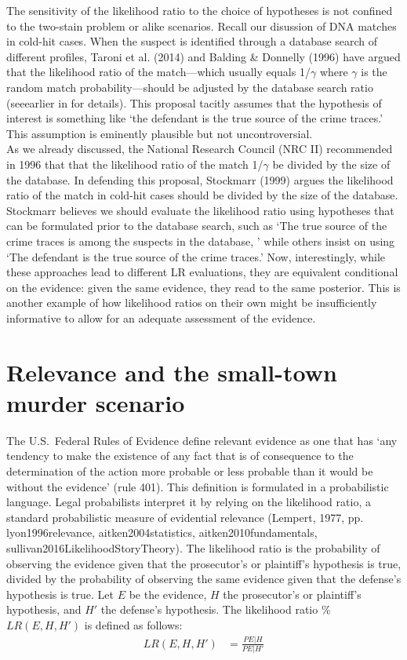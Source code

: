 \documentclass[10pt,dvipsnames,enabledeprecatedfontcommands]{scrartcl}
\begin{document}
The sensitivity of the likelihood ratio to the choice of hypotheses is
not confined to the two-stain problem or alike scenarios. Recall our
disussion of DNA matches in cold-hit cases. When the suspect is
identified through a database search of different profiles, Taroni et
al. (2014) and Balding \& Donnelly (1996) have argued that the
likelihood ratio of the match---which usually equals 1/\(\gamma\) where
\(\gamma\) is the random match probability---should be adjusted by the
database search ratio (seeearlier in  for details). This
proposal tacitly assumes that the hypothesis of interest is something
like `the defendant is the true source of the crime traces.' This
assumption is eminently plausible but not uncontroversial.\\
As we already discussed, the National Research Council (NRC II)
recommended in 1996 that that the likelihood ratio of the match
1/\(\gamma\) be divided by the size of the database. In defending this
proposal, Stockmarr (1999) argues the likelihood ratio of the match in
cold-hit cases should be divided by the size of the database. Stockmarr
believes we should evaluate the likelihood ratio using hypotheses that
can be formulated prior to the database search, such as `The true source
of the crime traces is among the suspects in the database, ' while
others insist on using `The defendant is the true source of the crime
traces.' Now, interestingly, while these approaches lead to different LR
evaluations, they are equivalent conditional on the evidence: given the
same evidence, they read to the same posterior. This is another example
of how likelihood ratios on their own might be insufficiently
informative to allow for an adequate assessment of the evidence.

\hypertarget{relevance-and-the-small-town-murder-scenario}{%
\section{Relevance and the small-town murder
scenario}\label{relevance-and-the-small-town-murder-scenario}}

The U.S.~Federal Rules of Evidence define relevant evidence as one that
has `any tendency to make the existence of any fact that is of
consequence to the determination of the action more probable or less
probable than it would be without the evidence' (rule 401). This
definition is formulated in a probabilistic language. Legal probabilists
interpret it by relying on the likelihood ratio, a standard
probabilistic measure of evidential relevance (Lempert, 1977, pp.
lyon1996relevance, aitken2004statistics, aitken2010fundamentals,
sullivan2016LikelihoodStoryTheory). The likelihood ratio is the
probability of observing the evidence given that the prosecutor's or
plaintiff's hypothesis is true, divided by the probability of observing
the same evidence given that the defense's hypothesis is true. Let \(E\)
be the evidence, \(H\) the prosecutor's or plaintiff's hypothesis, and
\(H'\) the defense's hypothesis. The likelihood ratio \%\(LR(E, H, H')\)
is defined as follows:
\begin{align*}LR(E,H,H') & = \frac{P{E\vert H}}{P{E\vert H'}}
\end{align*}
\end{document}
